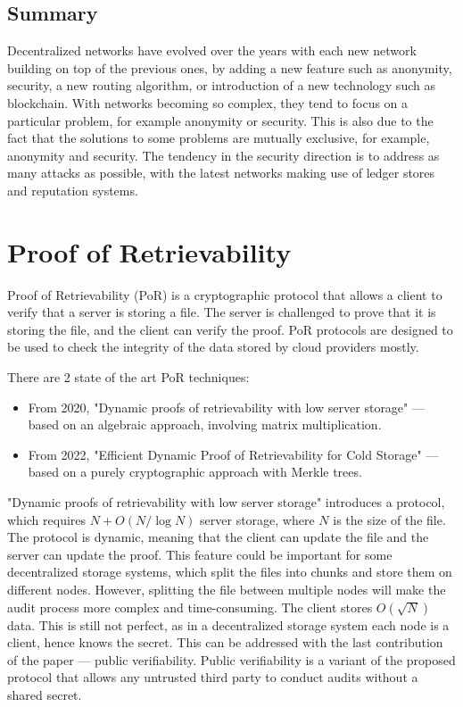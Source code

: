 \subsection{Summary}

Decentralized networks have evolved over the years with each new network building on top of the previous ones,
by adding a new feature such as anonymity, security, a new routing algorithm, or introduction of a new technology
such as blockchain.
With networks becoming so complex, they tend to focus on a particular problem,
for example anonymity or security.
This is also due to the fact that the solutions to some problems are mutually exclusive,
for example, anonymity and security.
The tendency in the security direction is to address as many attacks as possible,
with the latest networks making use of ledger stores and reputation systems.

\section{Proof of Retrievability}

Proof of Retrievability (PoR) \cite{porfirst} is a cryptographic protocol that
allows a client to verify that a server is storing a file.
The server is challenged to prove that it is storing the file, and the client
can verify the proof.
PoR protocols are designed to be used to check the integrity of the data stored by cloud providers mostly.

There are 2 state of the art PoR techniques:
\begin{itemize}
    \item From 2020, "Dynamic proofs of retrievability with low server storage" \cite{poralgebra} —
        based on an algebraic approach, involving matrix multiplication.
    \item From 2022, "Efficient Dynamic Proof of Retrievability for Cold Storage" \cite{pormerkle} —
        based on a purely cryptographic approach with Merkle trees.
\end{itemize}

"Dynamic proofs of retrievability with low server storage" introduces a protocol, which 
requires $N + O(N/\log N)$ server storage, where $N$ is the size of the file.
The protocol is dynamic, meaning that the client can update the file and the server can update the proof.
This feature could be important for some decentralized storage systems, which split the files into chunks and
store them on different nodes.
However, splitting the file between multiple nodes will make the audit process more complex and time-consuming.
The client stores $O(\sqrt{N})$ data.
This is still not perfect, as in a decentralized storage system each node is a client, hence knows the secret.
This can be addressed with the last contribution of the paper --- public verifiability.
Public verifiability is a variant of the proposed protocol that allows any untrusted third party
to conduct audits without a shared secret.


